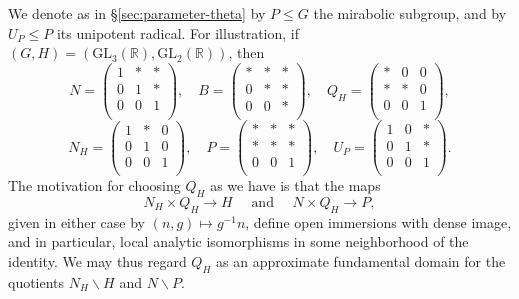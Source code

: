 We denote as in \S\ref{sec:parameter-theta} by $P \leq G$ the mirabolic subgroup, and by $U_P \leq P$ its unipotent radical.  For illustration, if $(G, H) =(\mathrm{GL}_3(\mathbb{R}), \mathrm{GL}_2(\mathbb{R}))$, then
\begin{equation*}
  N =
  \begin{pmatrix}
    1 & \ast & \ast \\
    0 & 1 & \ast \\
    0 & 0 & 1 \\
  \end{pmatrix},
  \quad
  B =
  \begin{pmatrix}
    \ast & \ast & \ast \\
    0 & \ast & \ast \\
    0 & 0 & \ast \\
  \end{pmatrix},
  \quad
  Q_H =
  \begin{pmatrix}
    \ast & 0 & 0 \\
    \ast & \ast & 0 \\
    0 & 0 & 1 \\
  \end{pmatrix},
\end{equation*}
\begin{equation*}
  N_H
  =
  \begin{pmatrix}
    1 & \ast & 0 \\
    0 & 1 & 0 \\
    0 & 0 & 1 \\
  \end{pmatrix},
  \quad
  P =
  \begin{pmatrix}
    \ast & \ast & \ast \\
    \ast & \ast & \ast \\
    0 & 0 & 1 \\
  \end{pmatrix},
  \quad
  U_P =
  \begin{pmatrix}
    1 & 0 & \ast \\
    0 & 1 & \ast \\
    0 & 0 & 1 \\
  \end{pmatrix}.
\end{equation*}
The motivation for choosing $Q_H$ as we have is that the maps
\begin{equation}\label{eq:crb6fpkcd0}
  N_H \times Q_H \rightarrow H
  \quad \text{ and } \quad
  N \times Q_H \rightarrow P,
\end{equation}
given in either case by $(n,g) \mapsto g^{-1} n$, define open immersions with dense image, and in particular, local analytic isomorphisms in some neighborhood of the identity.  We may thus regard $Q_H$ as an approximate fundamental domain for the quotients $N_H \backslash H$ and $N \backslash P$.

